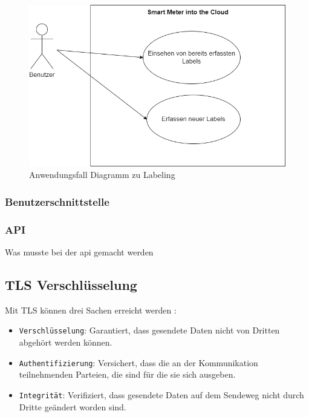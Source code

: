 \begin{figure}[H]
    \centering
    \includegraphics[width=1.0\textwidth]{gfx/labeling.drawio}
    \caption{Anwendungsfall Diagramm zu Labeling}
    \label{fig:labeling}
\end{figure}


\subsubsection{Benutzerschnittstelle}

\subsubsection{API}
Was musste bei der api gemacht werden

\subsection{\ac{TLS} Verschlüsselung}

Mit \ac{TLS} können drei Sachen erreicht werden \parencite{what_is_tls}:

\begin{itemize}
    \item \texttt{Verschlüsselung}: Garantiert, dass gesendete Daten nicht von Dritten abgehört werden können.
    \item \texttt{Authentifizierung}: Versichert, dass die an der Kommunikation teilnehmenden Parteien, die sind für die sie sich ausgeben.
    \item \texttt{Integrität}: Verifiziert, dass gesendete Daten auf dem Sendeweg nicht durch Dritte geändert worden sind.
\end{itemize}

